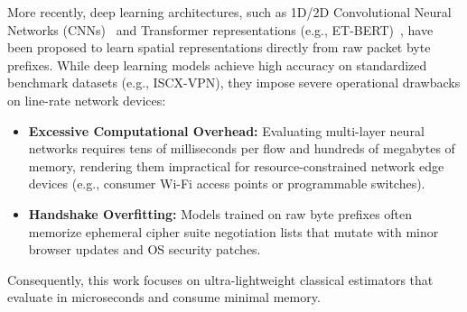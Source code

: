 \documentclass[conference]{IEEEtran}
\begin{document}
More recently, deep learning architectures, such as 1D/2D Convolutional Neural Networks (CNNs)~\cite{wang2017end,lotfollahi2020deep} and Transformer representations (e.g., ET-BERT)~\cite{lin2022etbert}, have been proposed to learn spatial representations directly from raw packet byte prefixes. While deep learning models achieve high accuracy on standardized benchmark datasets (e.g., ISCX-VPN), they impose severe operational drawbacks on line-rate network devices:
\begin{itemize}
    \item \textbf{Excessive Computational Overhead:} Evaluating multi-layer neural networks requires tens of milliseconds per flow and hundreds of megabytes of memory, rendering them impractical for resource-constrained network edge devices (e.g., consumer Wi-Fi access points or programmable switches).
    \item \textbf{Handshake Overfitting:} Models trained on raw byte prefixes often memorize ephemeral cipher suite negotiation lists that mutate with minor browser updates and OS security patches.
\end{itemize}
Consequently, this work focuses on ultra-lightweight classical estimators that evaluate in microseconds and consume minimal memory.
\end{document}
